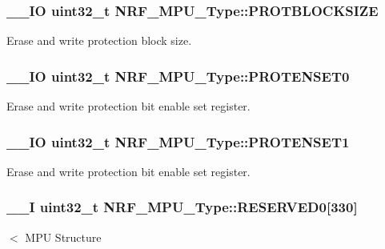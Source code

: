 \subsubsection[{P\+R\+O\+T\+B\+L\+O\+C\+K\+S\+I\+Z\+E}]{\setlength{\rightskip}{0pt plus 5cm}\+\_\+\+\_\+\+I\+O uint32\+\_\+t N\+R\+F\+\_\+\+M\+P\+U\+\_\+\+Type\+::\+P\+R\+O\+T\+B\+L\+O\+C\+K\+S\+I\+Z\+E}\label{struct_n_r_f___m_p_u___type_ab2e8e26a7099d2888094d1ccad95b96c}
Erase and write protection block size. \hypertarget{struct_n_r_f___m_p_u___type_a0e8b289c19e967c65aed85c9af04df60}{}
\subsubsection[{P\+R\+O\+T\+E\+N\+S\+E\+T0}]{\setlength{\rightskip}{0pt plus 5cm}\+\_\+\+\_\+\+I\+O uint32\+\_\+t N\+R\+F\+\_\+\+M\+P\+U\+\_\+\+Type\+::\+P\+R\+O\+T\+E\+N\+S\+E\+T0}\label{struct_n_r_f___m_p_u___type_a0e8b289c19e967c65aed85c9af04df60}
Erase and write protection bit enable set register. \hypertarget{struct_n_r_f___m_p_u___type_a309e19a51d9d7978148322d565c5a479}{}
\subsubsection[{P\+R\+O\+T\+E\+N\+S\+E\+T1}]{\setlength{\rightskip}{0pt plus 5cm}\+\_\+\+\_\+\+I\+O uint32\+\_\+t N\+R\+F\+\_\+\+M\+P\+U\+\_\+\+Type\+::\+P\+R\+O\+T\+E\+N\+S\+E\+T1}\label{struct_n_r_f___m_p_u___type_a309e19a51d9d7978148322d565c5a479}
Erase and write protection bit enable set register. \hypertarget{struct_n_r_f___m_p_u___type_aae5e5cd0babde76ba8a799b66132e466}{}
\subsubsection[{R\+E\+S\+E\+R\+V\+E\+D0}]{\setlength{\rightskip}{0pt plus 5cm}\+\_\+\+\_\+\+I uint32\+\_\+t N\+R\+F\+\_\+\+M\+P\+U\+\_\+\+Type\+::\+R\+E\+S\+E\+R\+V\+E\+D0\mbox{[}330\mbox{]}}\label{struct_n_r_f___m_p_u___type_aae5e5cd0babde76ba8a799b66132e466}
$<$ M\+P\+U Structure \hypertarget{struct_n_r_f___m_p_u___type_a68229ed01c4052fbe934fdd7e3842a9e}{}

